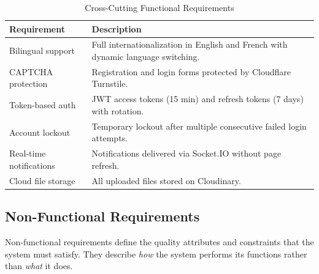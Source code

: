\begin{table}[H]
\centering
\caption{Cross-Cutting Functional Requirements}
\label{tab:fr-cross}
\begin{tabular}{|p{4cm}|p{10cm}|}
\hline
\textbf{Requirement} & \textbf{Description} \\
\hline
Bilingual support & Full internationalization in English and French with dynamic language switching. \\
\hline
CAPTCHA protection & Registration and login forms protected by Cloudflare Turnstile. \\
\hline
Token-based auth & JWT access tokens (15 min) and refresh tokens (7 days) with rotation. \\
\hline
Account lockout & Temporary lockout after multiple consecutive failed login attempts. \\
\hline
Real-time notifications & Notifications delivered via Socket.IO without page refresh. \\
\hline
Cloud file storage & All uploaded files stored on Cloudinary. \\
\hline
\end{tabular}
\end{table}

\subsection{Non-Functional Requirements}

Non-functional requirements define the quality attributes and constraints that the system must satisfy. They describe \textit{how} the system performs its functions rather than \textit{what} it does.

